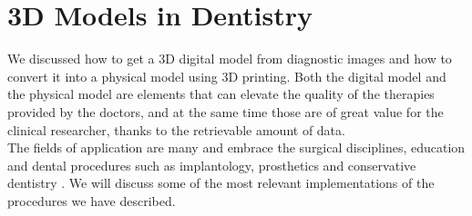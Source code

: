 
\chapter{3D Models in Dentistry} %

\label{Chapter6} %

 
 
We discussed how to get a 3D digital model from diagnostic images and how to convert it into a physical model using 3D printing. Both the digital model and the physical model are elements that can elevate the quality of the therapies provided by the doctors, and at the same time those are of great value for the clinical researcher, thanks to the retrievable amount of data.\\
The fields of application are many and embrace the surgical disciplines, education and dental procedures such as implantology, prosthetics and conservative dentistry \parencite{Reference103}.
We will discuss some of the most relevant implementations of the procedures we have described.

